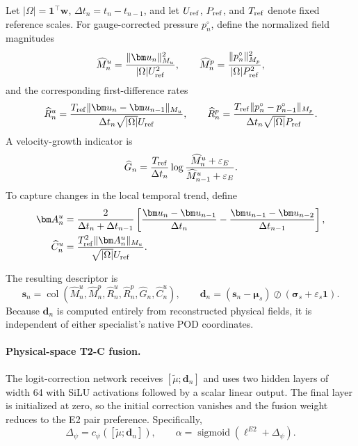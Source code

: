 Let
$|\Omega|=\bm 1^\top\bm w$,
$\Delta t_n=t_n-t_{n-1}$,
and let $U_{\rm ref}$, $P_{\rm ref}$, and $T_{\rm ref}$ denote fixed
reference scales.
For gauge-corrected pressure $p_n^\circ$, define the normalized field
magnitudes
\begin{equation}
  \widehat M_n^u
  =
  \frac{
    \|\bm u_n\|_{M_u}^2
  }{
    |\Omega|U_{\rm ref}^2
  },
  \qquad
  \widehat M_n^p
  =
  \frac{
    \|p_n^\circ\|_{M_p}^2
  }{
    |\Omega|P_{\rm ref}^2
  },
  \label{eq:app_t2c_magnitude}
\end{equation}
and the corresponding first-difference rates
\begin{equation}
  \widehat R_n^u
  =
  \frac{
    T_{\rm ref}
    \|\bm u_n-\bm u_{n-1}\|_{M_u}
  }{
    \Delta t_n\sqrt{|\Omega|}U_{\rm ref}
  },
  \qquad
  \widehat R_n^p
  =
  \frac{
    T_{\rm ref}
    \|p_n^\circ-p_{n-1}^\circ\|_{M_p}
  }{
    \Delta t_n\sqrt{|\Omega|}P_{\rm ref}
  }.
  \label{eq:app_t2c_rate}
\end{equation}
A velocity-growth indicator is
\begin{equation}
  \widehat G_n
  =
  \frac{T_{\rm ref}}{\Delta t_n}
  \log
  \frac{
    \widehat M_n^u+\varepsilon_E
  }{
    \widehat M_{n-1}^u+\varepsilon_E
  }.
  \label{eq:app_t2c_growth}
\end{equation}
To capture changes in the local temporal trend, define
\begin{align}
  \bm A_n^u
  &=
  \frac{2}{\Delta t_n+\Delta t_{n-1}}
  \left[
    \frac{\bm u_n-\bm u_{n-1}}{\Delta t_n}
    -
    \frac{\bm u_{n-1}-\bm u_{n-2}}{\Delta t_{n-1}}
  \right],
  \nonumber\\
  \widehat C_n^u
  &=
  \frac{
    T_{\rm ref}^2
    \|\bm A_n^u\|_{M_u}
  }{
    \sqrt{|\Omega|}U_{\rm ref}
  }.
  \label{eq:app_t2c_curvature}
\end{align}

The resulting descriptor is
\begin{equation}
  \bm s_n
  =
  \operatorname{col}
  \left(
    \widehat M_n^u,
    \widehat M_n^p,
    \widehat R_n^u,
    \widehat R_n^p,
    \widehat G_n,
    \widehat C_n^u
  \right),
  \qquad
  \bm d_n
  =
  (\bm s_n-\bm\mu_s)
  \oslash
  (\bm\sigma_s+\varepsilon_s\bm 1).
  \label{eq:app_t2c_descriptor}
\end{equation}
Because $\bm d_n$ is computed entirely from reconstructed physical fields,
it is independent of either specialist's native POD coordinates.


\paragraph{Physical-space T2-C fusion.}
The logit-correction network receives
$[\widetilde\mu;\bm d_n]$ and uses two hidden layers of width 64 with SiLU
activations followed by a scalar linear output.
The final layer is initialized at zero, so the initial correction vanishes
and the fusion weight reduces to the E2 pair preference.
Specifically,
\begin{equation}
  \Delta_\psi
  =
  c_\psi
  \left(
    [\widetilde\mu;\bm d_n]
  \right),
  \qquad
  \alpha
  =
  \operatorname{sigmoid}
  \left(
    \ell^{E2}+\Delta_\psi
  \right).
  \label{eq:app_t2c_gate}
\end{equation}

